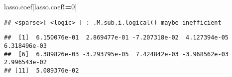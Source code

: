\documentclass[]{article}
\newenvironment{Shaded}{\begin{snugshade}}{\end{snugshade}}
\newcommand{\DecValTok}[1]{\textcolor[rgb]{0.00,0.00,0.81}{#1}}
\newcommand{\OperatorTok}[1]{\textcolor[rgb]{0.81,0.36,0.00}{\textbf{#1}}}
\newcommand{\NormalTok}[1]{#1}
\begin{document}
\begin{Shaded}
\begin{Highlighting}[]
\NormalTok{lasso.coef[lasso.coef}\OperatorTok{!=}\DecValTok{0}\NormalTok{]}
\end{Highlighting}
\end{Shaded}

\begin{verbatim}
## <sparse>[ <logic> ] : .M.sub.i.logical() maybe inefficient
\end{verbatim}

\begin{verbatim}
##  [1]  6.150076e-01  2.869477e-01 -7.207318e-02  4.127394e-05  6.318496e-03
##  [6]  6.389826e-03 -3.293795e-05  7.424842e-03 -3.968562e-03  2.996543e-02
## [11]  5.089376e-02
\end{verbatim}
\end{document}
